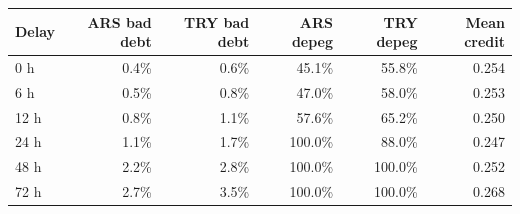 \begin{tabular}{lrrrrr}
\toprule
Delay & ARS bad debt & TRY bad debt & ARS depeg & TRY depeg & Mean credit \\
\midrule
0 h & 0.4\% & 0.6\% & 45.1\% & 55.8\% & 0.254 \\
6 h & 0.5\% & 0.8\% & 47.0\% & 58.0\% & 0.253 \\
12 h & 0.8\% & 1.1\% & 57.6\% & 65.2\% & 0.250 \\
24 h & 1.1\% & 1.7\% & 100.0\% & 88.0\% & 0.247 \\
48 h & 2.2\% & 2.8\% & 100.0\% & 100.0\% & 0.252 \\
72 h & 2.7\% & 3.5\% & 100.0\% & 100.0\% & 0.268 \\
\bottomrule
\end{tabular}
